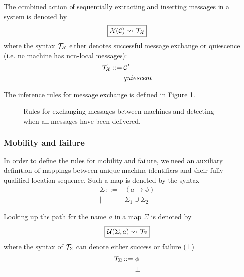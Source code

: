The combined action of sequentially extracting and inserting messages in a
system is denoted by
\begin{equation*}
\boxed{\mathcal{X}(\mathcal{C}) \leadsto \mathcal{T}_{\mathcal{X}}}
\end{equation*}
where the syntax $\mathcal{T}_{\mathcal{X}}$ either denotes successful message exchange or
quiescence (i.e. no machine has non-local messages):
\begin{align*}
 \mathcal{T}_{\mathcal{X}} ::={}& \mathcal{C}' \\
    |\quad{}& quiescent
\end{align*}

The inference rules for message exchange is defined in Figure \ref{fig:rule:exchange}.

\begin{figure}[!h]
\caption{Rules for exchanging messages between machines and detecting when all
messages have been delivered.}\label{fig:rule:exchange}
\end{figure}


\subsubsection{Mobility and failure}

In order to define the rules for mobility and failure, we need an auxiliary
definition of mappings between unique machine identifiers and their fully
qualified location sequence. Such a map is denoted by the syntax
\begin{align*}
\Sigma ::={}& (a \mapsto \phi) \\
    |\quad{}& \Sigma_1 \cup \Sigma_2
\end{align*}

Looking up the path for the name $a$ in a map $\Sigma$ is denoted by
\begin{equation*}
\boxed{\mathcal{U}(\Sigma, a) \leadsto \mathcal{T}_\Sigma}
\end{equation*}
where the syntax of $\mathcal{T}_\Sigma$ can denote either success or failure ($\bot$):
\begin{align*}
 \mathcal{T}_\Sigma ::={}& \phi \\
        |\quad{}& \bot
\end{align*}

